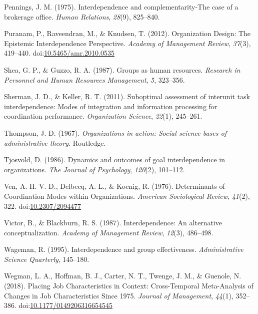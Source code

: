 \documentclass[english,,man]{apa6}
\theoremstyle{definition}
\theoremstyle{definition}
\theoremstyle{definition}
\theoremstyle{remark}
\begin{document}
\leavevmode\hypertarget{ref-pennings_interdependence_1975}{}%
Pennings, J. M. (1975). Interdependence and complementarity-The case of
a brokerage office. \emph{Human Relations}, \emph{28}(9), 825--840.

\leavevmode\hypertarget{ref-puranam_organization_2012}{}%
Puranam, P., Raveendran, M., \& Knudsen, T. (2012). Organization Design:
The Epistemic Interdependence Perspective. \emph{Academy of Management
Review}, \emph{37}(3), 419--440.
doi:\href{https://doi.org/10.5465/amr.2010.0535}{10.5465/amr.2010.0535}

\leavevmode\hypertarget{ref-shea1987groups}{}%
Shea, G. P., \& Guzzo, R. A. (1987). Groups as human resources.
\emph{Research in Personnel and Human Resources Management}, \emph{5},
323--356.

\leavevmode\hypertarget{ref-sherman_suboptimal_2011-1}{}%
Sherman, J. D., \& Keller, R. T. (2011). Suboptimal assessment of
interunit task interdependence: Modes of integration and information
processing for coordination performance. \emph{Organization Science},
\emph{22}(1), 245--261.

\leavevmode\hypertarget{ref-thompson2017organizations}{}%
Thompson, J. D. (1967). \emph{Organizations in action: Social science
bases of administrative theory}. Routledge.

\leavevmode\hypertarget{ref-tjosvold_dynamics_1986}{}%
Tjosvold, D. (1986). Dynamics and outcomes of goal interdependence in
organizations. \emph{The Journal of Psychology}, \emph{120}(2),
101--112.

\leavevmode\hypertarget{ref-ven_determinants_1976}{}%
Ven, A. H. V. D., Delbecq, A. L., \& Koenig, R. (1976). Determinants of
Coordination Modes within Organizations. \emph{American Sociological
Review}, \emph{41}(2), 322.
doi:\href{https://doi.org/10.2307/2094477}{10.2307/2094477}

\leavevmode\hypertarget{ref-victor_interdependence_1987}{}%
Victor, B., \& Blackburn, R. S. (1987). Interdependence: An alternative
conceptualization. \emph{Academy of Management Review}, \emph{12}(3),
486--498.

\leavevmode\hypertarget{ref-wageman_interdependence_1995}{}%
Wageman, R. (1995). Interdependence and group effectiveness.
\emph{Administrative Science Quarterly}, 145--180.

\leavevmode\hypertarget{ref-wegman_placing_2018}{}%
Wegman, L. A., Hoffman, B. J., Carter, N. T., Twenge, J. M., \& Guenole,
N. (2018). Placing Job Characteristics in Context: Cross-Temporal
Meta-Analysis of Changes in Job Characteristics Since 1975.
\emph{Journal of Management}, \emph{44}(1), 352--386.
doi:\href{https://doi.org/10.1177/0149206316654545}{10.1177/0149206316654545}
\end{document}
